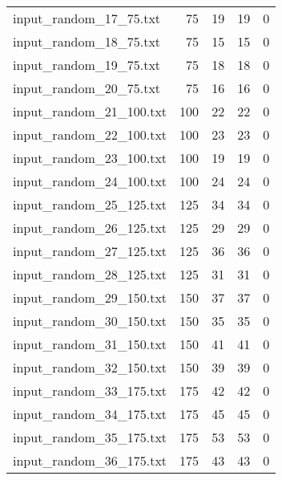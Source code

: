 \begin{table}[H]
\begin{tabular}{lrrrr}
     input\_random\_17\_75.txt  &      75 &        19 &                 19 &           0     \\
     input\_random\_18\_75.txt  &      75 &        15 &                 15 &           0     \\
     input\_random\_19\_75.txt  &      75 &        18 &                 18 &           0     \\
     input\_random\_20\_75.txt  &      75 &        16 &                 16 &           0     \\
     input\_random\_21\_100.txt &     100 &        22 &                 22 &           0     \\
     input\_random\_22\_100.txt &     100 &        23 &                 23 &           0     \\
     input\_random\_23\_100.txt &     100 &        19 &                 19 &           0     \\
     input\_random\_24\_100.txt &     100 &        24 &                 24 &           0     \\
     input\_random\_25\_125.txt &     125 &        34 &                 34 &           0     \\
     input\_random\_26\_125.txt &     125 &        29 &                 29 &           0     \\
     input\_random\_27\_125.txt &     125 &        36 &                 36 &           0     \\
     input\_random\_28\_125.txt &     125 &        31 &                 31 &           0     \\
     input\_random\_29\_150.txt &     150 &        37 &                 37 &           0     \\
     input\_random\_30\_150.txt &     150 &        35 &                 35 &           0     \\
     input\_random\_31\_150.txt &     150 &        41 &                 41 &           0     \\
     input\_random\_32\_150.txt &     150 &        39 &                 39 &           0     \\
     input\_random\_33\_175.txt &     175 &        42 &                 42 &           0     \\
     input\_random\_34\_175.txt &     175 &        45 &                 45 &           0     \\
     input\_random\_35\_175.txt &     175 &        53 &                 53 &           0     \\
     input\_random\_36\_175.txt &     175 &        43 &                 43 &           0     \\

\end{tabular}
\end{table}
